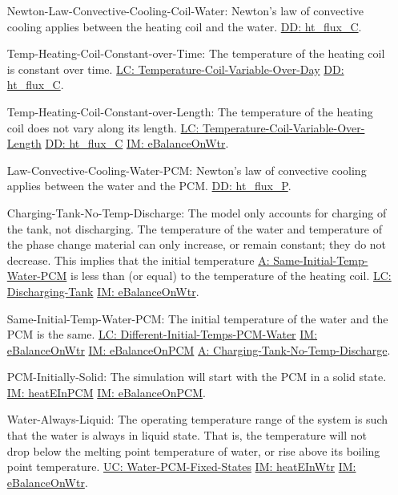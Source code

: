 \documentclass[12pt]{article}
\begin{document}
\begin{itemize}
\item[Newton-Law-Convective-Cooling-Coil-Water:\phantomsection\label{assumpLCCCW}]Newton's law of convective cooling applies between the heating coil and the water. \hyperref[DD:ht.flux.C]{DD: ht\_flux\_C}.
\item[Temp-Heating-Coil-Constant-over-Time:\phantomsection\label{assumpTHCCoT}]The temperature of the heating coil is constant over time. \hyperref[likeChgTCVOD]{LC: Temperature-Coil-Variable-Over-Day} \hyperref[DD:ht.flux.C]{DD: ht\_flux\_C}.
\item[Temp-Heating-Coil-Constant-over-Length:\phantomsection\label{assumpTHCCoL}]The temperature of the heating coil does not vary along its length. \hyperref[likeChgTCVOL]{LC: Temperature-Coil-Variable-Over-Length} \hyperref[DD:ht.flux.C]{DD: ht\_flux\_C} \hyperref[IM:eBalanceOnWtr]{IM: eBalanceOnWtr}.
\item[Law-Convective-Cooling-Water-PCM:\phantomsection\label{assumpLCCWP}]Newton's law of convective cooling applies between the water and the PCM. \hyperref[DD:ht.flux.P]{DD: ht\_flux\_P}.
\item[Charging-Tank-No-Temp-Discharge:\phantomsection\label{assumpCTNOD}]The model only accounts for charging of the tank, not discharging. The temperature of the water and temperature of the phase change material can only increase, or remain constant; they do not decrease. This implies that the initial temperature \hyperref[assumpSITWP]{A: Same-Initial-Temp-Water-PCM} is less than (or equal) to the temperature of the heating coil. \hyperref[likeChgDT]{LC: Discharging-Tank} \hyperref[IM:eBalanceOnWtr]{IM: eBalanceOnWtr}.
\item[Same-Initial-Temp-Water-PCM:\phantomsection\label{assumpSITWP}]The initial temperature of the water and the PCM is the same. \hyperref[likeChgDITPW]{LC: Different-Initial-Temps-PCM-Water} \hyperref[IM:eBalanceOnWtr]{IM: eBalanceOnWtr} \hyperref[IM:eBalanceOnPCM]{IM: eBalanceOnPCM} \hyperref[assumpCTNOD]{A: Charging-Tank-No-Temp-Discharge}.
\item[PCM-Initially-Solid:\phantomsection\label{assumpPIS}]The simulation will start with the PCM in a solid state. \hyperref[IM:heatEInPCM]{IM: heatEInPCM} \hyperref[IM:eBalanceOnPCM]{IM: eBalanceOnPCM}.
\item[Water-Always-Liquid:\phantomsection\label{assumpWAL}]The operating temperature range of the system is such that the water is always in liquid state. That is, the temperature will not drop below the melting point temperature of water, or rise above its boiling point temperature. \hyperref[unlikeChgWPFS]{UC: Water-PCM-Fixed-States} \hyperref[IM:heatEInWtr]{IM: heatEInWtr} \hyperref[IM:eBalanceOnWtr]{IM: eBalanceOnWtr}.

\end{itemize}
\end{document}
